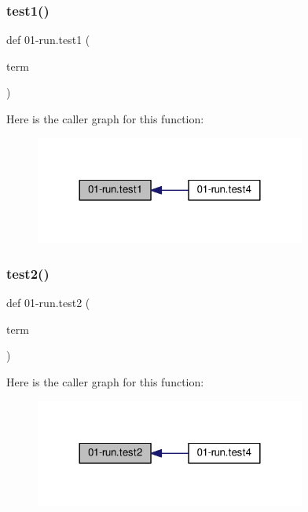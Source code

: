 \subsubsection{\texorpdfstring{test1()}{test1()}}
{\footnotesize\ttfamily def 01-\/run.\+test1 (\begin{DoxyParamCaption}\item[{}]{term }\end{DoxyParamCaption})}

Here is the caller graph for this function\+:
\nopagebreak
\begin{figure}[H]
\begin{center}
\leavevmode
\includegraphics[width=252pt]{namespace01-run_a06344429edc2313358f59b0e501f1ae5_icgraph}
\end{center}
\end{figure}
\mbox{\label{namespace01-run_ada98d444a3fe857d31d3d37e9f356d8e}} 
\subsubsection{\texorpdfstring{test2()}{test2()}}
{\footnotesize\ttfamily def 01-\/run.\+test2 (\begin{DoxyParamCaption}\item[{}]{term }\end{DoxyParamCaption})}

Here is the caller graph for this function\+:
\nopagebreak
\begin{figure}[H]
\begin{center}
\leavevmode
\includegraphics[width=252pt]{namespace01-run_ada98d444a3fe857d31d3d37e9f356d8e_icgraph}
\end{center}
\end{figure}
\mbox{\label{namespace01-run_a257feca6e1f04f60b7588f885a4a4467}} 

